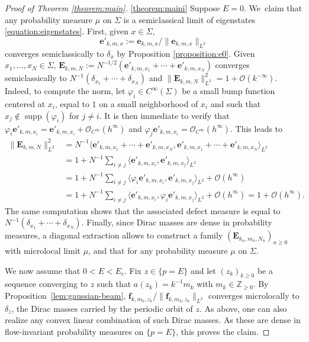 \documentclass[JEP,XML,SOM,Unicode,published]{cedram}
\newcommand{\bE}{\boldsymbol{E}}
\newcommand{\bme}{\boldsymbol{e}}
\newcommand{\bmf}{\boldsymbol{f}}
\theoremstyle{plain}
\theoremstyle{definition}
\let\mc\mathcal
\newcommand{\Z}{\mathbb{Z}}
\DeclareMathOperator{\supp}{supp}
\begin{document}
\skpt
\begin{proof}[Proof of Theorem \ref{theorem:main}]

\eqref{theorem:maini}
Suppose $E=0$. We~claim that any probability measure $\mu$ on $\Sigma$ is a semiclassical limit of eigenstates \eqref{equation:eigenstates}. First, given $x \in \Sigma$,
\[
\bme'_{k,m,x} := \bme_{k,m,x}/\|\bme_{k,m,x}\|_{L^2}
\]
converges semiclassically to $\delta_x$ by Proposition \ref{proposition:e0}. Given $x_1,\dots, x_N \in \Sigma$, $\bE_{k,m,N} := N^{-1/2}(\bme'_{k,m,x_1} +\cdots+ \bme'_{k,m,x_N})$ converges semiclassically to $N^{-1}(\delta_{x_1}+\cdots+\delta_{x_N})$ and $\|\bE_{k,m,N}\|^2_{L^2} = 1 + \mc{O}(k^{-\infty})$. Indeed, to compute the norm, let $\varphi_{i} \in C^\infty(\Sigma)$ be a small bump function centered at $x_i$, equal to $1$ on a small neighborhood of $x_i$ and such that $x_j \notin \supp(\varphi_i)$ for $j \neq i$. It is then immediate to verify that $\varphi_i \bme'_{k,m,x_i} = \bme'_{k,m,x_i} + \mc{O}_{C^\infty}(h^\infty)$ and $\varphi_j \bme'_{k,m,x_i} = \mc{O}_{C^\infty}(h^\infty)$. This leads to
\[
\begin{split}
\|\bE_{k,m,N}\|^2_{L^2} & = N^{-1}\langle \bme'_{k,m,x_1} +\cdots+ \bme'_{k,m,x_N}, \bme'_{k,m,x_1} +\cdots+ \bme'_{k,m,x_N}\rangle_{L^2} \\
& = 1 + N^{-1} \sum_{i \neq j} \langle \bme'_{k,m,x_i},\bme'_{k,m,x_j}\rangle_{L^2} \\
& = 1 + N^{-1} \sum_{i \neq j} \langle \varphi_i \bme'_{k,m,x_i},\bme'_{k,m,x_j}\rangle_{L^2} + \mc{O}(h^\infty) \\
& = 1 + N^{-1} \sum_{i \neq j} \langle \bme'_{k,m,x_i},\varphi_i \bme'_{k,m,x_j}\rangle_{L^2} + \mc{O}(h^\infty) = 1 + \mc{O}(h^\infty).
\end{split}
\]
The same computation shows that the associated defect measure is equal to \hbox{$N^{-1}(\delta_{x_1}+\cdots+\delta_{x_N})$}. Finally, since Dirac masses are dense in probability measures, a diagonal extraction allows to construct a family $(\bE_{k_n,m_n,N_n})_{n \geq 0}$ with microlocal limit $\mu$, and that for any probability measure $\mu$ on $\Sigma$.

We now assume that $0 < E < E_c$. Fix $z \in \{p=E\}$ and let $(z_k)_{k \geq 0}$ be a sequence converging to $z$ such that $a(z_k) = k^{-1}m_k$ with $m_k \in \Z_{\geq 0}$. By Proposition~\ref{lem:gaussian-beam}, $\bmf_{k,m_k,z_k}/\|\bmf_{k,m_k,z_k}\|_{L^2}$ converges microlocally to $\delta_z$, the Dirac masses carried by the periodic orbit of $z$. As above, one can also realize any convex linear combination of such Dirac masses. As these are dense in flow-invariant probability measures on $\{p=E\}$, this proves the claim.


\end{proof}
\end{document}
